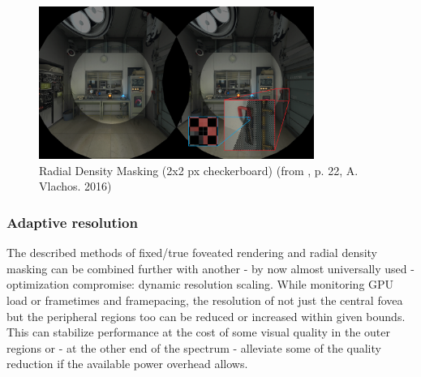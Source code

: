 \begin{figure}[H]
  \centering
  \includegraphics[width=0.8\textwidth]{pictures/vlachos_RDM}
  \caption{Radial Density Masking (2x2 px checkerboard) (from \cite{Vlachos.2016c}, p. 22, A. Vlachos. 2016)} \label{fig:vlachos_RDM}
\end{figure} 

\subsubsection{Adaptive resolution}
The described methods of fixed/true foveated rendering and radial density masking can be combined further with another - by now almost universally used - optimization compromise: dynamic resolution scaling. While monitoring GPU load or frametimes and framepacing, the resolution of not just the central fovea but the peripheral regions too can be reduced or increased within given bounds. This can stabilize performance at the cost of some visual quality in the outer regions or - at the other end of the spectrum - alleviate some of the quality reduction if the available power overhead allows. 

